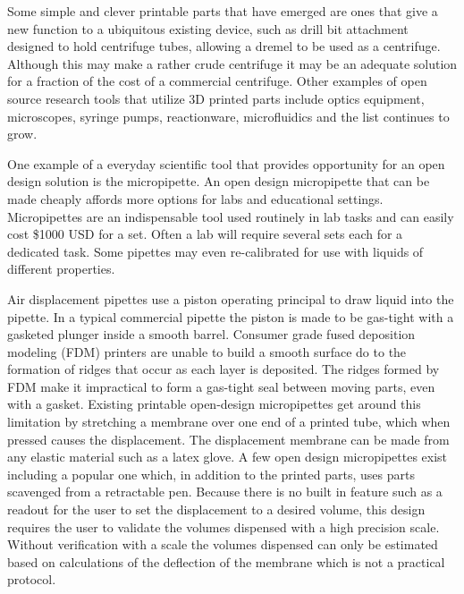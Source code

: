 \documentclass[10pt,letterpaper]{article}
\begin{document}
Some simple and clever printable parts that have emerged are ones that give a new function to a ubiquitous existing device, such as drill bit attachment designed to hold centrifuge tubes, allowing a dremel to be used as a centrifuge\cite{Garvey2009}.
Although this may make a rather crude centrifuge it may be an adequate solution for a fraction of the cost of a commercial centrifuge.
Other examples of open source research tools that utilize 3D printed parts include optics equipment\cite{Zhang2013}, microscopes\cite{Baden2014a,Walus2014}, syringe pumps\cite{Wijnen2014}, reactionware\cite{Symes2012,Kitson2012,Mathieson2013,Kitson2014}, microfluidics\cite{Brennan2015,Dragone2013} and the list continues to grow\cite{PlosCollections}.

One example of a everyday scientific tool that provides opportunity for an open design solution is the micropipette.
An open design micropipette that can be made cheaply affords more options for labs and educational settings.
Micropipettes are an indispensable tool used routinely in lab tasks and can easily cost \$1000 USD for a set.
Often a lab will require several sets each for a dedicated task.
Some pipettes may even re-calibrated for use with liquids of different properties.

Air displacement pipettes use a piston operating principal to draw liquid into the pipette\cite{ISO8655}.
In a typical commercial pipette the piston is made to be gas-tight with a gasketed plunger inside a smooth barrel.
Consumer grade fused deposition modeling (FDM) printers are unable to build a smooth surface do to the formation of ridges that occur as each layer is deposited.
The ridges formed by FDM make it impractical to form a gas-tight seal between moving parts, even with a gasket.
Existing printable open-design micropipettes get around this limitation by stretching a membrane over one end of a printed tube, which when pressed causes the displacement.
The displacement membrane can be made from any elastic material such as a latex glove.
A few open design micropipettes exist including a popular one which, in addition to the printed parts, uses parts scavenged from a retractable pen\cite{Baden2014}.
Because there is no built in feature such as a readout for the user to set the displacement to a desired volume, this design requires the user to validate the volumes dispensed with a high precision scale.
Without verification with a scale the volumes dispensed can only be estimated based on calculations of the deflection of the membrane which is not a practical protocol.
\end{document}
